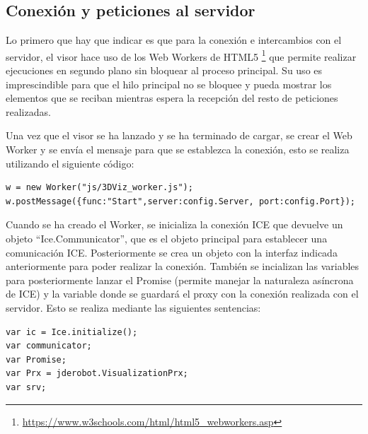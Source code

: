 \subsection{Conexión y peticiones al servidor}
Lo primero que hay que indicar es que para la conexión e intercambios con el servidor, el visor hace uso de los Web Workers de HTML5 \footnote{\url{https://www.w3schools.com/html/html5_webworkers.asp}} que permite realizar ejecuciones en segundo plano sin bloquear al proceso principal. Su uso es imprescindible para que el hilo principal no se bloquee y pueda mostrar los elementos que se reciban mientras espera la recepción del resto de peticiones realizadas.

Una vez que el visor se ha lanzado y se ha terminado de cargar, se crear el Web Worker y se envía el mensaje para que se establezca la conexión, esto se realiza utilizando el siguiente código:
\begin{lstlisting}[frame=single]
w = new Worker("js/3DViz_worker.js");
w.postMessage({func:"Start",server:config.Server, port:config.Port});
\end{lstlisting}

Cuando se ha creado el Worker, se inicializa la conexión ICE que devuelve un objeto ``Ice.Communicator'', que es el objeto principal para establecer una comunicación ICE. Posteriormente se crea un objeto con la interfaz indicada anteriormente para poder realizar la conexión. También se incializan las variables para posteriormente lanzar el Promise (permite manejar la naturaleza asíncrona de ICE) y la variable donde se guardará el proxy con la conexión realizada con el servidor. Esto se realiza mediante las siguientes sentencias:
\begin{lstlisting}[frame=single]
var ic = Ice.initialize();
var communicator;
var Promise;
var Prx = jderobot.VisualizationPrx;
var srv;
\end{lstlisting}

